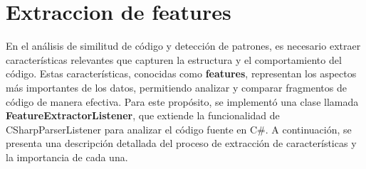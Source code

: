 \section{Extraccion de features}

En el análisis de similitud de código y detección de patrones, es necesario extraer características relevantes que capturen la estructura y el comportamiento del código. Estas características, conocidas como {\bf features}, representan los aspectos más importantes de los datos, permitiendo analizar y comparar fragmentos de código de manera efectiva. Para este propósito, se implementó una clase llamada {\bf FeatureExtractorListener}, que extiende la funcionalidad de CSharpParserListener para analizar el código fuente en C\#. A continuación, se presenta una descripción detallada del proceso de extracción de características y la importancia de cada una. \\


